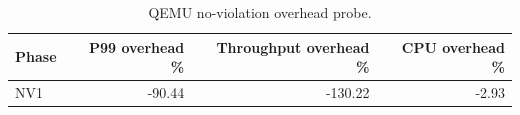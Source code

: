 
\begin{table}[t]
\centering
\scriptsize
\caption{QEMU no-violation overhead probe.}
\begin{tabular}{lrrr}
\toprule
Phase & P99 overhead \% & Throughput overhead \% & CPU overhead \% \\
\midrule
NV1 & -90.44 & -130.22 & -2.93 \\
\bottomrule
\end{tabular}
\end{table}
